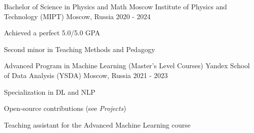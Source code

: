 
\begin{cventries}
  \cventry
    {Bachelor of Science in Physics and Math} %
    {Moscow Institute of Physics and Technology (MIPT)} %
    {Moscow, Russia} %
    {2020 - 2024} %
    {
        \begin{cvitems}
         \item { Achieved a perfect 5.0/5.0 GPA }
         \item { Second minor in Teaching Methods and Pedagogy }
        \end{cvitems}
    }
    
  \cventry
    {Advanced Program in Machine Learning (Master's Level Courses)} %
    {Yandex School of Data Analysis (YSDA)}
    {Moscow, Russia}
    {2021 - 2023}
    {
      \begin{cvitems} %
        \item { Specialization in DL and NLP }
        \item { Open-source contributions (see \textit{Projects}) }
        \item { Teaching assistant for the Advanced Machine Learning course }
      \end{cvitems}
    }
\end{cventries}
